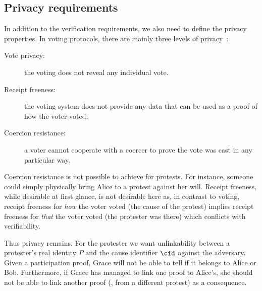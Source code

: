 \subsection{Privacy requirements}%
\label{privacy-properties}

In addition to the verification requirements, we also need to define the 
privacy properties.
In voting protocols, there are mainly three levels of 
privacy~\cite{VerifyingPrivacyPropertiesOfVotingProtocols}:
\begin{description}
  \item[Vote privacy:] the voting does not reveal any individual vote.
  \item[Receipt freeness:] the voting system does not provide any data that can 
    be used as a proof of how the voter voted.
  \item[Coercion resistance:] a voter cannot cooperate with a coercer to prove 
    the vote was cast in any particular way.
\end{description}

Coercion resistance is not possible to achieve for protests.
For instance, someone could simply physically bring Alice to a protest against 
her will.
Receipt freeness, while desirable at first glance, is not desirable
here as, in contrast to voting, receipt freeness for \emph{how} the
voter voted (\ie the cause of the protest) implies receipt freeness
for \emph{that} the voter voted (\ie the protester was there) which
conflicts with verifiability.  

Thus privacy remains.
For the protester we want unlinkability between a protester's real identity 
\(P\) and the cause identifier \(\cid\) against the adversary.
Given a participation proof, Grace will not be able to tell if it belongs to 
Alice or Bob.
Furthermore, if Grace has managed to link one proof to Alice's, she should not 
be able to link another proof (\eg, from a different protest) as a consequence.


